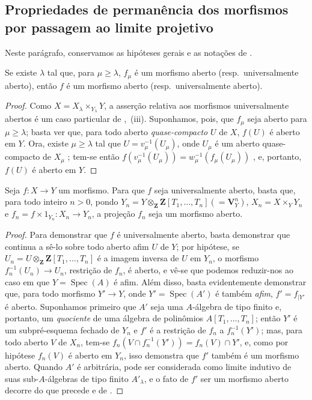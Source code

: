 \subsection{Propriedades de permanência dos morfismos por passagem ao limite projetivo}
\label{subsection:IV.8.10}

Neste parágrafo, conservamos as hipóteses gerais e as notações de .

\begin{proposition}[8.10.1]
\label{IV.8.10.1}
Se existe $\lambda$ tal que, para $\mu\geqslant\lambda$, $f_\mu$ é um morfismo aberto (resp.\ universalmente aberto), então $f$ é um morfismo aberto (resp.\ universalmente aberto).
\end{proposition}

\begin{proof}
Como $X=X_\lambda\times_{Y_\lambda}Y$, a asserção relativa aos morfismos universalmente abertos é um caso particular de ,~(iii).
Suponhamos, pois, que $f_\mu$ seja aberto para $\mu\geqslant\lambda$; basta ver que, para todo aberto \emph{quase-compacto} $U$ de $X$, $f(U)$ é aberto em $Y$.
Ora, existe $\mu\geqslant\lambda$ tal que $U=v_\mu^{-1}(U_\mu)$, onde $U_\mu$ é um aberto quase-compacto de $X_\mu$ ; tem-se então $f(v_\mu^{-1}(U_\mu))=w_\mu^{-1}(f_\mu(U_\mu))$ , e, portanto, $f(U)$ é aberto em $Y$.
\end{proof}

\begin{corollary}[8.10.2]
\label{IV.8.10.2}
Seja $f:X\to Y$ um morfismo.
Para que $f$ seja universalmente aberto, basta que, para todo inteiro $n>0$, pondo $Y_n=Y\otimes_\mathbf{Z}\mathbf{Z}[T_1,\ldots,T_n](=\mathbf{V}_Y^n)$, $X_n=X\times_Y Y_n$ e $f_n=f\times 1_{Y_n}:X_n\to Y_n$, a projeção $f_n$ seja um morfismo aberto.
\end{corollary}

\begin{proof}
Para demonstrar que $f$ é universalmente aberto, basta demonstrar que continua a sê-lo sobre todo aberto afim $U$ de $Y$; por hipótese, se $U_n=U\otimes_\mathbf{Z}\mathbf{Z}[T_1,\ldots,T_n]$ é a imagem inversa de $U$ em $Y_n$, o morfismo $f_n^{-1}(U_n)\to U_n$, restrição de $f_n$, é aberto, e vê-se que podemos reduzir-nos ao caso em que $Y=\operatorname{Spec}(A)$ é afim.
Além disso, basta evidentemente demonstrar que, para todo morfismo $Y'\to Y$, onde $Y'=\operatorname{Spec}(A')$ é também \emph{afim}, $f'=f_{|Y'}$ é aberto.
Suponhamos primeiro que $A'$ seja uma $A$-álgebra de tipo finito e, portanto, um \emph{quociente} de uma álgebra de polinômios $A[T_1,\ldots,T_n]$; então $Y'$ é um subpré-esquema fechado de $Y_n$ e $f'$ é a restrição
de $f_n$ a $f_n^{-1}(Y')$; mas, para todo aberto $V$ de $X_n$, tem-se $f_n(V\cap f_n^{-1}(Y'))=f_n(V)\cap Y'$, e, como por hipótese $f_n(V)$ é aberto em $Y_n$, isso demonstra que $f'$ também é um morfismo aberto.
Quando $A'$ é arbitrária, pode ser considerada como limite indutivo de suas sub-$A$-álgebras de tipo finito $A'_\lambda$, e o fato de $f'$ ser um morfismo aberto decorre do que precede e de .
\end{proof}

